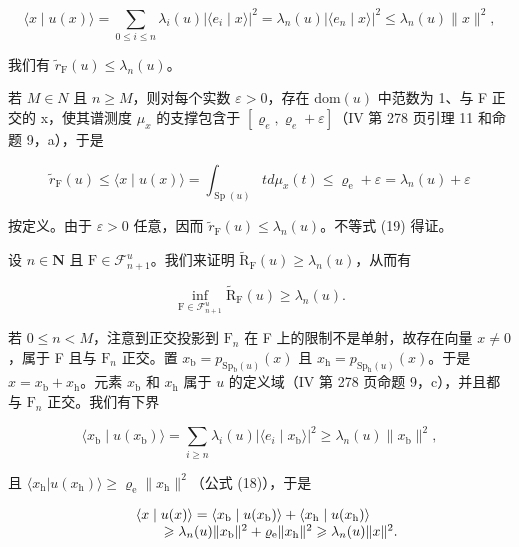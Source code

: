 \[
\langle x \mid u (x) \rangle = \sum_ {0 \leqslant i \leqslant n} \lambda_ {i} (u) | \langle e _ {i} \mid x \rangle | ^ {2} = \lambda_ {n} (u) | \langle e _ {n} \mid x \rangle | ^ {2} \leqslant \lambda_ {n} (u) \| x \| ^ {2},
\]

我们有 \(\widetilde{r}_{\mathrm{F}}(u) \leqslant \lambda_n(u)\)。

若 \(M \in N\) 且 \(n \geqslant M\)，则对每个实数 \(\varepsilon > 0\)，存在 \(\text{dom}(u)\) 中范数为 1、与 F 正交的 x，使其谱测度 \(\mu_{x}\) 的支撑包含于 \([\varrho_{e}, \varrho_{e} + \varepsilon]\)（IV 第 278 页引理 11 和命题 9，a），于是

\[
\widetilde {r} _ {\mathrm{F}} (u) \leqslant \langle x \mid u (x) \rangle = \int_ {\operatorname{Sp} (u)} t d \mu_ {x} (t) \leqslant \varrho_ {\mathrm{e}} + \varepsilon = \lambda_ {n} (u) + \varepsilon
\]

按定义。由于 \(\varepsilon > 0\) 任意，因而 \(\widetilde{r}_{\mathrm{F}}(u) \leqslant \lambda_n(u)\)。不等式 (19) 得证。

设 \(n \in \mathbf{N}\) 且 \(\mathrm{F} \in \mathcal{F}_{n+1}^{u}\)。我们来证明 \(\widetilde{\mathrm{R}}_{\mathrm{F}}(u) \geqslant \lambda_{n}(u)\)，从而有

\[
\inf _ {\mathrm{F} \in \mathcal {F} _ {n + 1} ^ {u}} \widetilde {\mathrm{R}} _ {\mathrm{F}} (u) \geqslant \lambda_ {n} (u).\tag{20}
\]

若 \(0 \leqslant n < M\)，注意到正交投影到 \(\mathrm{F}_n\) 在 F 上的限制不是单射，故存在向量 \(x \neq 0\)，属于 F 且与 \(\mathrm{F}_n\) 正交。置 \(x_{\mathrm{b}} = p_{\mathrm{Sp}_{\mathrm{b}}(u)}(x)\) 且 \(x_{\mathrm{h}} = p_{\mathrm{Sp}_{\mathrm{h}}(u)}(x)\)。于是 \(x = x_{\mathrm{b}} + x_{\mathrm{h}}\)。元素 \(x_{\mathrm{b}}\) 和 \(x_{\mathrm{h}}\) 属于 \(u\) 的定义域（IV 第 278 页命题 9，c），并且都与 \(\mathrm{F}_n\) 正交。我们有下界

\[
\langle x _ {\mathrm{b}} \mid u (x _ {\mathrm{b}}) \rangle = \sum_ {i \geqslant n} \lambda_ {i} (u) | \langle e _ {i} \mid x _ {\mathrm{b}} \rangle | ^ {2} \geqslant \lambda_ {n} (u) \| x _ {\mathrm{b}} \| ^ {2},
\]

且 \(\langle x_{\mathrm{h}}|u(x_{\mathrm{h}})\rangle \geqslant \varrho_{\mathrm{e}}\| x_{\mathrm{h}}\|^2\)（公式 (18)），于是

\[
\begin{array}{r l} & {\langle x \mid u (x) \rangle = \langle x _ {\mathrm{b}} \mid u (x _ {\mathrm{b}}) \rangle + \langle x _ {\mathrm{h}} \mid u (x _ {\mathrm{h}}) \rangle} \\ & {\qquad \geqslant \lambda_ {n} (u) \| x _ {\mathrm{b}} \| ^ {2} + \varrho_ {\mathrm{e}} \| x _ {\mathrm{h}} \| ^ {2} \geqslant \lambda_ {n} (u) \| x \| ^ {2}.} \end{array}
\]

